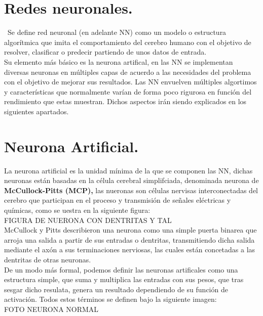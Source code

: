 \documentclass[a4paper,10pt]{article}
\begin{document}
\section{Redes neuronales.}
\
Se define red neuronal (en adelante NN) como un modelo o estructura algorítmica que imita el comportamiento del cerebro humano con el objetivo de resolver, clasificar o predecir partiendo de unos datos de entrada.\\
Su elemento más básico es la neurona artifical, en las NN se implementan diversas neuronas en múltiples capas de acuerdo a las necesidades del problema con el objetivo de mejorar sus resultados.
Las NN envuelven múltiples algortimos y características que normalmente varían de forma poco rigurosa en función del rendimiento que estas muestran. Dichos aspectos irán siendo  explicados en los siguientes apartados.
\section{Neurona Artificial.}
La neurona artificial es la unidad mínima de la que se componen las NN, dichas neuronas están basadas en la célula cerebral simplifciada, denominada neurona de \textbf{McCullock-Pitts (MCP),} las nueronas son células nervisas interconectadas del cerebro que participan en el proceso y transmisión de señales eléctricas y químicas, como se uestra en la siguiente figura: \\
FIGURA DE NUERONA CON DENTRITAS Y TAL\\
McCullock y Pitts describieron una neurona como una simple puerta binarea que arroja una salida a partir de sus entradas o dentritas, transmitiendo dicha salida mediante el axón a sus terminaciones nerviosas, las cuales están concetadas a las dentritas de otras neuronas.\\
De un modo más formal, podemos definir las neuronas artificales como una estructura simple, que suma y multiplica las entradas con sus pesos, que tras sesgar dicho resulata, genera un resultado dependiendo de su función de activación. Todos estos términos se definen bajo la siguiente imagen:
\\FOTO NEURONA NORMAL
\end{document}
